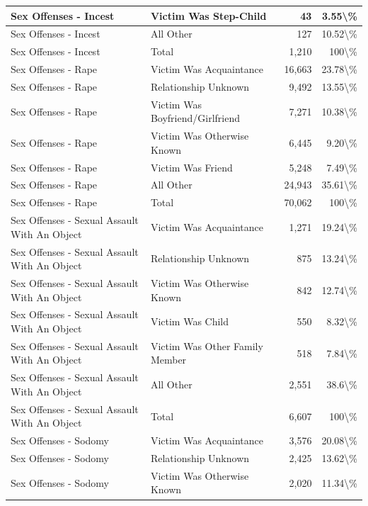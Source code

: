 \documentclass[
]{krantz}
\begin{document}
\begin{longtable}[t]{l|l|r|r}
\hline
Sex Offenses - Incest & Victim Was Step-Child & 43 & 3.55\textbackslash{}\%\\
\hline
Sex Offenses - Incest & All Other & 127 & 10.52\textbackslash{}\%\\
\hline
Sex Offenses - Incest & Total & 1,210 & 100\textbackslash{}\%\\
\hline
Sex Offenses - Rape & Victim Was Acquaintance & 16,663 & 23.78\textbackslash{}\%\\
\hline
Sex Offenses - Rape & Relationship Unknown & 9,492 & 13.55\textbackslash{}\%\\
\hline
Sex Offenses - Rape & Victim Was Boyfriend/Girlfriend & 7,271 & 10.38\textbackslash{}\%\\
\hline
Sex Offenses - Rape & Victim Was Otherwise Known & 6,445 & 9.20\textbackslash{}\%\\
\hline
Sex Offenses - Rape & Victim Was Friend & 5,248 & 7.49\textbackslash{}\%\\
\hline
Sex Offenses - Rape & All Other & 24,943 & 35.61\textbackslash{}\%\\
\hline
Sex Offenses - Rape & Total & 70,062 & 100\textbackslash{}\%\\
\hline
Sex Offenses - Sexual Assault With An Object & Victim Was Acquaintance & 1,271 & 19.24\textbackslash{}\%\\
\hline
Sex Offenses - Sexual Assault With An Object & Relationship Unknown & 875 & 13.24\textbackslash{}\%\\
\hline
Sex Offenses - Sexual Assault With An Object & Victim Was Otherwise Known & 842 & 12.74\textbackslash{}\%\\
\hline
Sex Offenses - Sexual Assault With An Object & Victim Was Child & 550 & 8.32\textbackslash{}\%\\
\hline
Sex Offenses - Sexual Assault With An Object & Victim Was Other Family Member & 518 & 7.84\textbackslash{}\%\\
\hline
Sex Offenses - Sexual Assault With An Object & All Other & 2,551 & 38.6\textbackslash{}\%\\
\hline
Sex Offenses - Sexual Assault With An Object & Total & 6,607 & 100\textbackslash{}\%\\
\hline
Sex Offenses - Sodomy & Victim Was Acquaintance & 3,576 & 20.08\textbackslash{}\%\\
\hline
Sex Offenses - Sodomy & Relationship Unknown & 2,425 & 13.62\textbackslash{}\%\\
\hline
Sex Offenses - Sodomy & Victim Was Otherwise Known & 2,020 & 11.34\textbackslash{}\%\\

\end{longtable}
\end{document}
